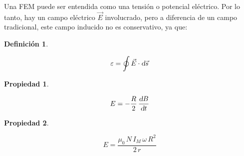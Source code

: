\documentclass[a5paper,12pt,twoside]{book}
\newtheorem{defn}{{Definición}}[chapter]
\newtheorem{prop}{{Propiedad}}[chapter]
\begin{document}
Una FEM puede ser entendida como una tensión o potencial eléctrico. Por lo tanto, hay un campo eléctrico $\Vec{E}$ involucrado, pero a diferencia de un campo tradicional, este campo inducido no es conservativo, ya que:

\begin{mdframed}[style=MyFrame1]
    \begin{defn}
    \end{defn}
    \begin{equation*}
        \varepsilon = \oint \Vec{E} \cdot \textsl{d} \Vec{s}
    \end{equation*}
\end{mdframed}

\begin{mdframed}[style=MyFrame1]
    \begin{prop}
    \end{prop}
    \begin{equation*}
        E = - \frac{R}{2} \, \frac{\textsl{d} B}{\textsl{d} t}
    \end{equation*}
\end{mdframed}

\begin{mdframed}[style=MyFrame1]
    \begin{prop}
    \end{prop}
    \begin{equation*}
        E = \frac{\mu_0 \, N \, I_M \, \omega \, R^2}{2 \, r}
    \end{equation*}
\end{mdframed}
\end{document}
